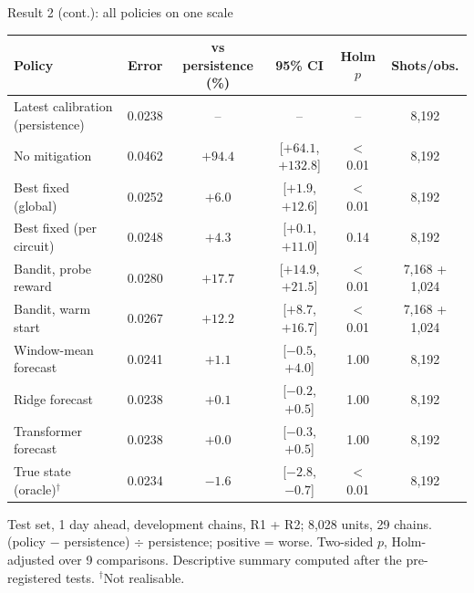 \documentclass[aspectratio=169,11pt]{beamer}
\begin{document}
\begin{frame}{Result 2 (cont.): all policies on one scale}
\begin{table}\scriptsize
\begin{tabular}{lccccc}
\toprule
\textbf{Policy} & \textbf{Error} & \textbf{vs persistence (\%)} & \textbf{95\% CI} & \textbf{Holm $p$} & \textbf{Shots/obs.} \\
\midrule
Latest calibration (persistence) & 0.0238 & -- & -- & -- & 8,192 \\
No mitigation & 0.0462 & $+94.4$ & [$+64.1$, $+132.8$] & $<$0.01 & 8,192 \\
Best fixed (global) & 0.0252 & $+6.0$ & [$+1.9$, $+12.6$] & $<$0.01 & 8,192 \\
Best fixed (per circuit) & 0.0248 & $+4.3$ & [$+0.1$, $+11.0$] & 0.14 & 8,192 \\
Bandit, probe reward & 0.0280 & $+17.7$ & [$+14.9$, $+21.5$] & $<$0.01 & 7,168 + 1,024 \\
Bandit, warm start & 0.0267 & $+12.2$ & [$+8.7$, $+16.7$] & $<$0.01 & 7,168 + 1,024 \\
Window-mean forecast & 0.0241 & $+1.1$ & [$-0.5$, $+4.0$] & 1.00 & 8,192 \\
Ridge forecast & 0.0238 & $+0.1$ & [$-0.2$, $+0.5$] & 1.00 & 8,192 \\
Transformer forecast & 0.0238 & $+0.0$ & [$-0.3$, $+0.5$] & 1.00 & 8,192 \\
True state (oracle)$^{\dagger}$ & 0.0234 & $-1.6$ & [$-2.8$, $-0.7$] & $<$0.01 & 8,192 \\
\bottomrule
\end{tabular}
\end{table}
{\scriptsize Test set, 1 day ahead, development chains, R1 + R2; 8,028 units, 29 chains. (policy $-$ persistence) $\div$ persistence; positive = worse. Two-sided $p$, Holm-adjusted over 9 comparisons. Descriptive summary computed after the pre-registered tests. $^{\dagger}$Not realisable.}
\end{frame}
\end{document}
